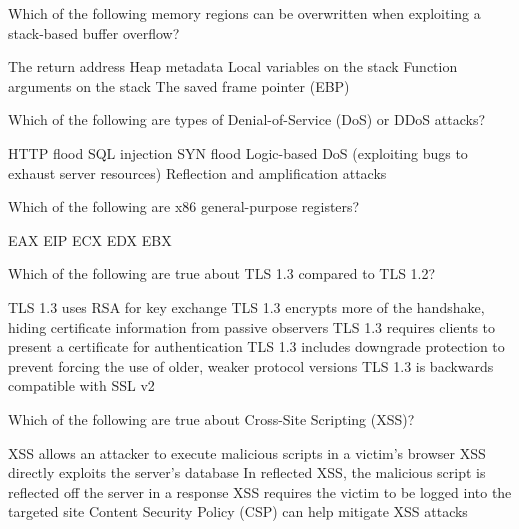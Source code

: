 \documentclass[addpoints]{exam}
\begin{document}
\begin{questions}
\question Which of the following memory regions can be overwritten when exploiting a stack-based buffer overflow?

\begin{checkboxes}
  \CorrectChoice The return address
  \choice Heap metadata
  \CorrectChoice Local variables on the stack
  \CorrectChoice Function arguments on the stack
  \CorrectChoice The saved frame pointer (EBP)
\end{checkboxes}


\question Which of the following are types of Denial-of-Service (DoS) or DDoS attacks?

\begin{checkboxes}
  \CorrectChoice HTTP flood
  \choice SQL injection
  \CorrectChoice SYN flood
  \CorrectChoice Logic-based DoS (exploiting bugs to exhaust server resources)
  \CorrectChoice Reflection and amplification attacks
\end{checkboxes}


\question Which of the following are x86 general-purpose registers?

\begin{checkboxes}
  \CorrectChoice EAX
  \choice EIP
  \CorrectChoice ECX
  \CorrectChoice EDX
  \CorrectChoice EBX
\end{checkboxes}


\question Which of the following are true about TLS 1.3 compared to TLS 1.2?

\begin{checkboxes}
  \choice TLS 1.3 uses RSA for key exchange
  \CorrectChoice TLS 1.3 encrypts more of the handshake, hiding certificate information from passive observers
  \choice TLS 1.3 requires clients to present a certificate for authentication
  \CorrectChoice TLS 1.3 includes downgrade protection to prevent forcing the use of older, weaker protocol versions
  \choice TLS 1.3 is backwards compatible with SSL v2
\end{checkboxes}


\question Which of the following are true about Cross-Site Scripting (XSS)?

\begin{checkboxes}
  \CorrectChoice XSS allows an attacker to execute malicious scripts in a victim's browser
  \choice XSS directly exploits the server's database
  \CorrectChoice In reflected XSS, the malicious script is reflected off the server in a response
  \choice XSS requires the victim to be logged into the targeted site
  \CorrectChoice Content Security Policy (CSP) can help mitigate XSS attacks
\end{checkboxes}



\end{questions}
\end{document}
